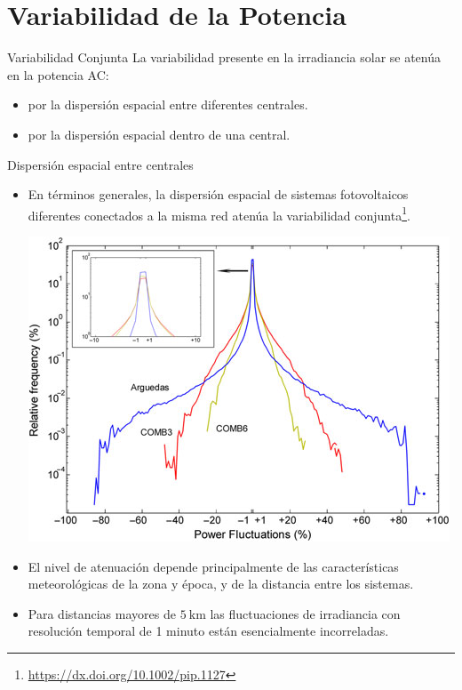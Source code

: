 \documentclass[aspectratio=169, usenames,svgnames,dvipsnames]{beamer}
\begin{document}
\section{Variabilidad de la Potencia}
\label{sec:org8256467}

\begin{frame}[label={sec:org38e870b}]{Variabilidad Conjunta}
La variabilidad presente en la irradiancia solar se \alert{atenúa} en la potencia AC:
\begin{itemize}
\item por la \alert{dispersión} espacial \alert{entre diferentes centrales}.
\item por la \alert{dispersión} espacial \alert{dentro de una central}.
\end{itemize}
\end{frame}

\begin{frame}[label={sec:org3d9ed67}]{Dispersión espacial entre centrales}
\begin{itemize}
\item En términos generales, la \alert{dispersión espacial de sistemas
fotovoltaicos diferentes} conectados a la misma red \alert{atenúa} la
variabilidad conjunta\footnote{\url{https://dx.doi.org/10.1002/pip.1127}}.

\begin{center}
\includegraphics[height=0.5\textheight]{../figs/Variabilidad_DispersionGeografica_Plantas.png}
\end{center}

\item El \alert{nivel de atenuación depende} principalmente de las
\alert{características meteorológicas} de la zona y época, y de la
\alert{distancia} entre los sistemas.

\item Para \alert{distancias mayores de \(\SI{5}{\kilo\meter}\)} las fluctuaciones
de irradiancia con resolución temporal de 1 minuto están
esencialmente \alert{incorreladas}.
\end{itemize}
\end{frame}
\end{document}
